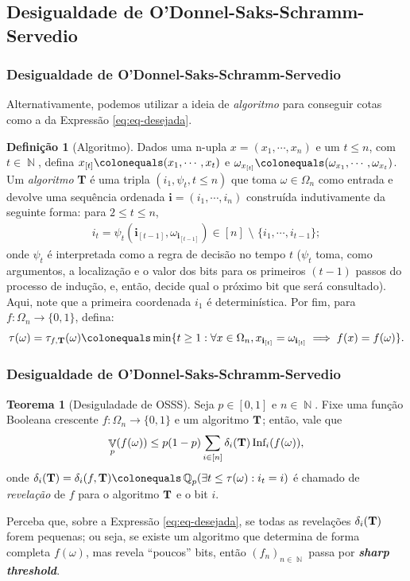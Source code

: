 \documentclass[9pt]{beamer}
\theoremstyle{definition} %
\newtheorem{mydef}{Definição}
\newtheorem{mythm}{Teorema}
\DeclareMathOperator{\VX}{\mathbb{V}} %
\DeclareMathOperator{\NX}{\mathbb{N}} %
\DeclareMathOperator{\QX}{\mathbb{Q}} %
\newcommand{\infl}{\text{Inf}_i(f(\omega))}
\begin{document}
	\subsection{Desigualdade de O'Donnel-Saks-Schramm-Servedio}
	\begin{frame}[t]
		\frametitle{Desigualdade de O'Donnel-Saks-Schramm-Servedio}
		Alternativamente, podemos utilizar a ideia de \textit{algoritmo} para conseguir cotas como a da Expressão \ref{eq:eq-desejada}.
		\begin{mydef}[Algoritmo]
				Dados uma n-upla $x = (x_1, \cdots, x_n)$ e um $t \leq n$, com $t \in \NX$, defina $x_{[t]} \colonequals (x_1, \cdots, x_t)$ e $\omega_{x_{[t]}} \colonequals (\omega_{x_1}, \cdots, \omega_{x_t})$. Um \textit{algoritmo} \textbf{T} é uma tripla $(i_1, \psi_t, t \leq n)$ que toma $\omega \in \Omega_n$ como entrada e devolve uma sequência ordenada $\textbf{i} = (i_1, \cdots, i_n)$ construída indutivamente da seguinte forma: para $2 \leq t \leq n$,
				\begin{align*}
					i_t = \psi_t(\textbf{i}_{[t-1]}, \omega_{\textbf{i}_{[t-1]}}) \in [n] \text{~\textbackslash~} \{i_1, \cdots, i_{t-1}\};
				\end{align*}
				onde $\psi_t$ é interpretada como a regra de decisão no tempo $t$ ($\psi_t$ toma, como argumentos, a localização e o valor dos bits para os primeiros $(t-1)$ passos do processo de indução, e, então, decide qual o próximo bit que será consultado). Aqui, note que a primeira coordenada $i_1$ é determinística. Por fim, para $f:\Omega_n \to \{0,1\}$, defina:
				\begin{align*}
					\tau(\omega) = \tau_{f, \text{\textbf{T}}}(\omega) \colonequals \min\{t \geq 1: \forall x \in \Omega_n, x_{\textbf{i}_{[t]}} = \omega_{\textbf{i}_{[t]}} \implies f(x) = f(\omega)\}.
				\end{align*}
		\end{mydef}
	\end{frame}

	\begin{frame}[t]
		\frametitle{Desigualdade de O'Donnel-Saks-Schramm-Servedio}	
		\begin{mythm}[Desiguladade de OSSS]\label{thm:osss}
			Seja $p \in [0,1]$ e $n \in \NX$. Fixe uma função Booleana crescente $f: \Omega_n \to \{0,1\}$ e um algoritmo $\text{\textbf{T}}$; então, vale que
			\begin{align*}
				\VX_p(f(\omega)) \leq p(1 - p) \sum_{i \in [n]} \delta_i(\text{\textbf{T}}) \, \infl, 
			\end{align*}
			onde $\delta_i(\text{\textbf{T}}) = \delta_i(f, \text{\textbf{T}}) \colonequals \QX_p(\exists t \leq \tau(\omega) : i_t = i)$ é chamado de \textit{revelação} de $f$ para o algoritmo $\text{\textbf{T}}$ e o bit $i$.
		\end{mythm}
		\vspace{-3pt}
		Perceba que, sobre a Expressão \ref{eq:eq-desejada}, se todas as revelações $\delta_i(\text{\textbf{T}})$ forem pequenas; ou seja, se existe um algoritmo que determina de forma completa $f(\omega)$, mas revela ``poucos'' bits, então $(f_n)_{n \in \NX}$ passa por \textit{\textbf{sharp threshold}}.
		
	\end{frame}
\end{document}
